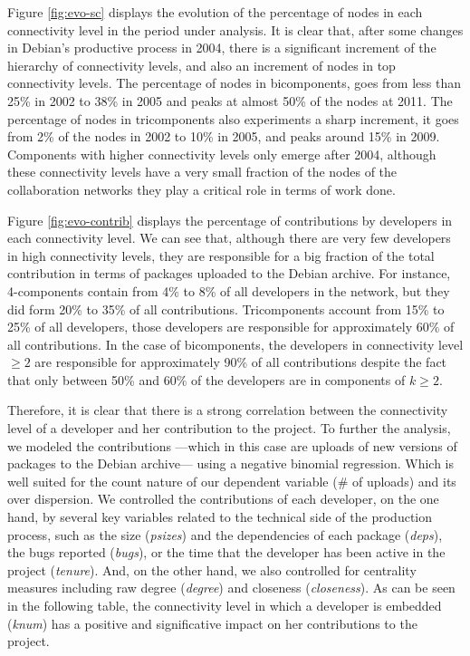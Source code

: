 Figure \ref{fig:evo-sc} displays the evolution of the percentage of nodes in each connectivity level in the period under analysis. It is clear that, after some changes in Debian's productive process in 2004, there is a significant increment of the hierarchy of connectivity levels, and also an increment of nodes in top connectivity levels. The percentage of nodes in bicomponents, goes from less than 25\% in 2002 to 38\% in 2005 and peaks at almost 50\% of the nodes at 2011. The percentage of nodes in tricomponents also experiments a sharp increment, it goes from 2\% of the nodes in 2002 to 10\% in 2005, and peaks around 15\% in 2009. Components with higher connectivity levels only emerge after 2004, although these connectivity levels have a very small fraction of the nodes of the collaboration networks they play a critical role in terms of work done.

Figure \ref{fig:evo-contrib} displays the percentage of contributions by developers in each connectivity level. We can see that, although there are very few developers in high connectivity levels, they are responsible for a big fraction of the total contribution in terms of packages uploaded to the Debian archive. For instance, 4-components contain from 4\% to 8\% of all developers in the network, but they did form 20\% to 35\% of all contributions. Tricomponents account from 15\% to 25\% of all developers, those developers are responsible for approximately 60\% of all contributions. In the case of bicomponents, the developers in connectivity level $\ge 2$ are responsible for approximately 90\% of all contributions despite the fact that only between 50\% and 60\% of the developers are in components of $k \ge 2$.

Therefore, it is clear that there is a strong correlation between the connectivity level of a developer and her contribution to the project. To further the analysis, we modeled the contributions ---which in this case are uploads of new versions of packages to the Debian archive--- using a negative binomial regression. Which is well suited for the count nature of our dependent variable (\# of uploads) and its over dispersion. We controlled the contributions of each developer, on the one hand, by several key variables related to the technical side of the production process, such as the size (\emph{psizes}) and the dependencies of each package (\emph{deps}), the bugs reported (\emph{bugs}), or the time that the developer has been active in the project (\emph{tenure}). And, on the other hand, we also controlled for centrality measures including raw degree (\emph{degree}) and closeness (\emph{closeness}). As can be seen in the following table, the connectivity level in which a developer is embedded (\emph{knum}) has a positive and significative impact on her contributions to the project.

